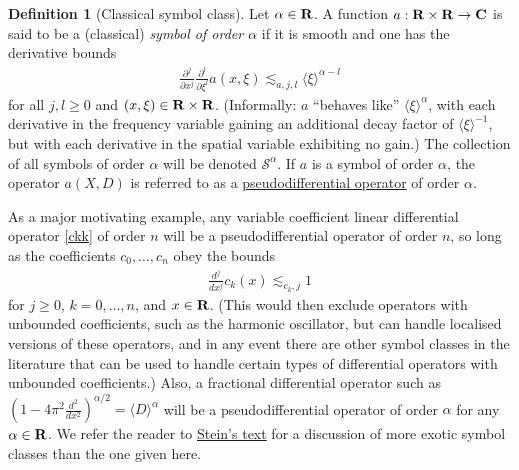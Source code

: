 \documentclass[11pt]{article}
\theoremstyle{definition}
\newtheorem{definition}[theorem]{Definition}
\theoremstyle{remark}
\begin{document}
\begin{definition}[Classical symbol class]
 \label{symb} Let \({\alpha \in {\bf R}}\). A function \({a: {\bf R} \times {\bf R} \rightarrow {\bf C}}\) is said to be a (classical) \emph{symbol of order \({\alpha}\)} if it is smooth and one has the derivative bounds 
\begin{align}\label{class-symb}
  \frac{\partial^j}{\partial x^j} \frac{\partial^l}{\partial \xi^l} a(x,\xi) \lesssim_{a,j,l} \langle \xi \rangle^{\alpha - l} 
\end{align}
 for all \({j,l \geq 0}\) and \({(x,\xi) \in {\bf R} \times {\bf R}}\). (Informally: \({a}\) “behaves like” \({\langle \xi \rangle^\alpha}\), with each derivative in the frequency variable gaining an additional decay factor of \({\langle \xi \rangle^{-1}}\), but with each derivative in the spatial variable exhibiting no gain.) The collection of all symbols of order \({\alpha}\) will be denoted \({{\mathcal S}^\alpha}\). If \({a}\) is a symbol of order \({\alpha}\), the operator \({a(X,D)}\) is referred to as a \href{https://en.wikipedia.org/wiki/Pseudo-differential_operator}{pseudodifferential operator} of order \({\alpha}\). 
\end{definition}

As a major motivating example, any variable coefficient linear differential operator \eqref{ckk} of order \({n}\) will be a pseudodifferential operator of order \({n}\), so long as the coefficients \({c_0,\dots,c_n}\) obey the bounds 
\begin{align}\label{cb}
  \frac{d^j}{d x^j} c_k(x) \lesssim_{c_k, j} 1 
\end{align}
 for \({j \geq 0}\), \({k=0,\dots,n}\), and \({x \in {\bf R}}\). (This would then exclude operators with unbounded coefficients, such as the harmonic oscillator, but can handle localised versions of these operators, and in any event there are other symbol classes in the literature that can be used to handle certain types of differential operators with unbounded coefficients.) Also, a fractional differential operator such as \({(1 - 4\pi^2 \frac{d^2}{dx^2})^{\alpha/2} = \langle D \rangle^\alpha}\) will be a pseudodifferential operator of order \({\alpha}\) for any \({\alpha \in {\bf R}}\). We refer the reader to \href{https://mathscinet.ams.org/mathscinet-getitem?mr=1232192}{Stein’s text} for a discussion of more exotic symbol classes than the one given here.
\end{document}
